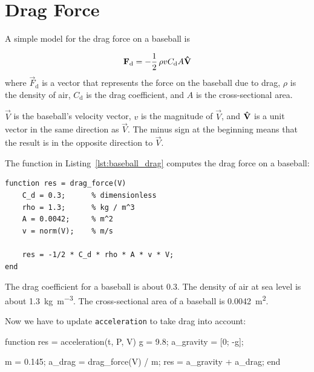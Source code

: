 \section{Drag Force}
\label{drag}


A simple model for the drag force on a baseball is

\begin{equation*}
    \vec{F}_\mathrm{d} = - \frac{1}{2} \, \rho v C_\mathrm{d} A \uvec{V}
\end{equation*}
where $\vec{F}_\mathrm{d}$ is a vector that represents the force on the baseball
due to drag,
$\rho$ is the density of air,
$C_\mathrm{d}$ is the drag coefficient, and
$A$ is the cross-sectional area.


$\vec{V}$ is the baseball's velocity vector, $v$ is the magnitude of $\vec{V}$, and $\uvec{V}$ is a unit vector in the same direction as $\vec{V}$.  The minus sign at the beginning means that the result is in the opposite direction to $\vec{V}$.


The function in Listing~\ref{lst:baseball_drag} computes the drag force on a baseball:

\begin{lstlisting}[caption={A function that calculates the drag force on a baseball}, label={lst:baseball_drag}]
 function res = drag_force(V)
    C_d = 0.3;      % dimensionless
    rho = 1.3;      % kg / m^3
    A = 0.0042;     % m^2
    v = norm(V);    % m/s

    res = -1/2 * C_d * rho * A * v * V;
end
\end{lstlisting}

The drag coefficient for a baseball is about 0.3.
The density of air at sea level is about \SI{1.3}{\kilogram\per\meter\cubed}.
The cross-sectional area of a baseball is \SI{0.0042}{\meter\squared}.


Now we have to update \lstinline{acceleration} to take drag into account:

\begin{code}
function res = acceleration(t, P, V)
    g = 9.8;                       %
    a_gravity = [0; -g];

    m = 0.145;                     %
    a_drag = drag_force(V) / m;
    res = a_gravity + a_drag;
end
\end{code}

